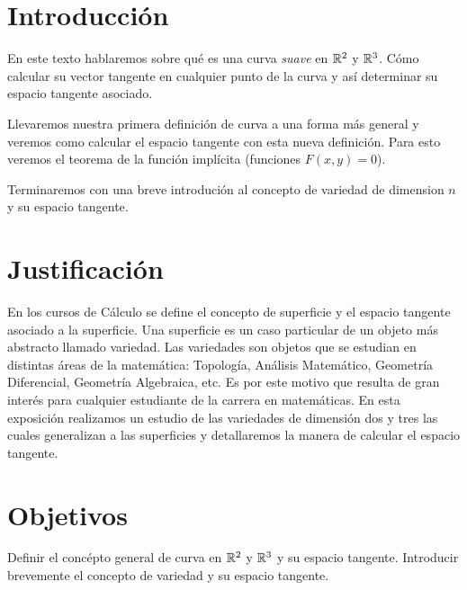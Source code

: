 \section{Introducción}
En este texto hablaremos sobre qué es una curva \emph{suave} en $\mathbb{R}^{2}$ y $\mathbb{R}^{3}$. Cómo calcular su vector tangente en cualquier punto de la curva y así determinar
su espacio tangente asociado.

Llevaremos nuestra primera definición de curva a una forma más general y veremos como calcular el espacio tangente con esta nueva definición. Para esto veremos el teorema
de la función implícita (funciones $F(x,y)=0$).

Terminaremos con una breve introdución al concepto de variedad de dimension $n$ y su espacio tangente.
\section{Justificación}
En los cursos de Cálculo se define el concepto de superficie y el espacio tangente asociado a la superficie. Una superficie es un caso particular de un objeto más abstracto llamado variedad. Las variedades son objetos que se estudian en distintas áreas de la matemática: Topología, Análisis Matemático, Geometría Diferencial, Geometría Algebraica, etc. Es por este motivo que resulta de gran interés para cualquier estudiante de la carrera en matemáticas. En esta exposición realizamos un estudio de las variedades de dimensión dos y tres las cuales generalizan a las superficies y detallaremos la manera de calcular el espacio tangente.

\section{Objetivos}
Definir el concépto general de curva en $\mathbb{R}^{2}$ y $\mathbb{R}^{3}$ y su espacio tangente. Introducir brevemente el concepto de variedad y su espacio tangente.

